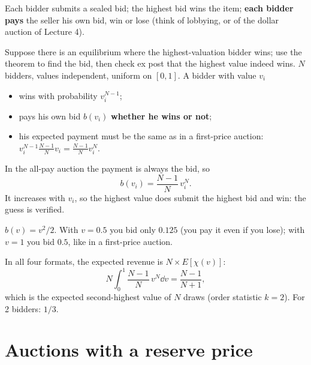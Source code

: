 \documentclass[11pt,a4paper,openany]{book}
\begin{document}
\begin{defnbox}[title=All-pay auction]
Each bidder submits a sealed bid; the highest bid wins the item; \textbf{each bidder pays}
the seller his own bid, win or lose (think of lobbying, or of the dollar auction of
Lecture 4).
\end{defnbox}

\begin{propbox}[title=Optimal bid via revenue equivalence]
Suppose there is an equilibrium where the highest-valuation bidder wins; use the theorem to
find the bid, then check ex post that the highest value indeed wins. $N$ bidders, values
independent, uniform on $[0,1]$. A bidder with value $v_i$
\begin{itemize}
  \item wins with probability $v_i^{N-1}$;
  \item pays his own bid $b(v_i)$ \textbf{whether he wins or not};
  \item his expected payment must be the same as in a first-price auction:
        $v_i^{N-1}\frac{N-1}{N} v_i = \frac{N-1}{N} v_i^N$.
\end{itemize}
In the all-pay auction the payment is always the bid, so
\[
b(v_i) = \frac{N-1}{N}\, v_i^N.
\]
It increases with $v_i$, so the highest value does submit the highest bid and win: the guess
is verified.
\end{propbox}

\begin{exbox}[title={Numbers (not on the slides): 2 bidders}]
$b(v) = v^2/2$. With $v = 0.5$ you bid only $0.125$ (you pay it even if you lose); with
$v = 1$ you bid $0.5$, like in a first-price auction.
\end{exbox}

\begin{propbox}[title={Seller's expected revenue (not on the slides)}]
In all four formats, the expected revenue is $N \times E[\chi(v)]$:
\[
N \int_0^1 \frac{N-1}{N}\, v^N \dd v = \frac{N-1}{N+1},
\]
which is the expected second-highest value of $N$ draws (order statistic $k = 2$). For 2
bidders: $1/3$.
\end{propbox}


\section{Auctions with a reserve price}
\end{document}
